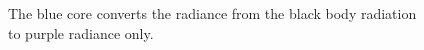 \begin{figure}[h!]
\centering
{}
\caption
{
\label{fig:fire4}
The blue core converts the radiance from the black body radiation to purple radiance only.   
}
\end{figure}

